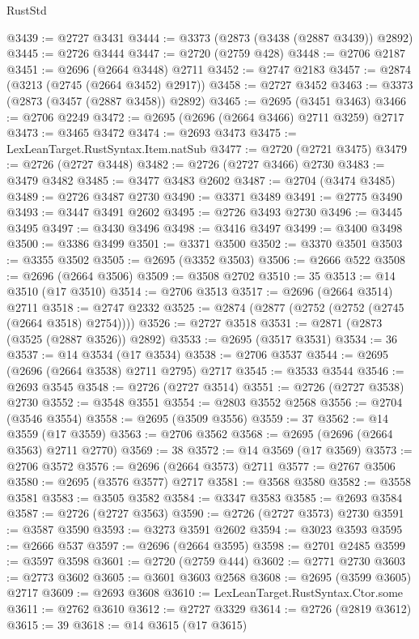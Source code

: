 \begin{lexlean}{RustStd}
\begin{coremodule}
@3439 := @2727 @3431
@3444 := @3373 (@2873 (@3438 (@2887 @3439)) @2892)
@3445 := @2726 @3444
@3447 := @2720 (@2759 @428)
@3448 := @2706 @2187
@3451 := @2696 (@2664 @3448) @2711
@3452 := @2747 @2183
@3457 := @2874 (@3213 (@2745 (@2664 @3452) @2917))
@3458 := @2727 @3452
@3463 := @3373 (@2873 (@3457 (@2887 @3458)) @2892)
@3465 := @2695 (@3451 @3463)
@3466 := @2706 @2249
@3472 := @2695 (@2696 (@2664 @3466) @2711 @3259) @2717
@3473 := @3465 @3472
@3474 := @2693 @3473
@3475 := LexLeanTarget.RustSyntax.Item.natSub
@3477 := @2720 (@2721 @3475)
@3479 := @2726 (@2727 @3448)
@3482 := @2726 (@2727 @3466) @2730
@3483 := @3479 @3482
@3485 := @3477 @3483 @2602
@3487 := @2704 (@3474 @3485)
@3489 := @2726 @3487 @2730
@3490 := @3371 @3489
@3491 := @2775 @3490
@3493 := @3447 @3491 @2602
@3495 := @2726 @3493 @2730
@3496 := @3445 @3495
@3497 := @3430 @3496
@3498 := @3416 @3497
@3499 := @3400 @3498
@3500 := @3386 @3499
@3501 := @3371 @3500
@3502 := @3370 @3501
@3503 := @3355 @3502
@3505 := @2695 (@3352 @3503)
@3506 := @2666 @522
@3508 := @2696 (@2664 @3506)
@3509 := @3508 @2702
@3510 := 35
@3513 := @14 @3510 (@17 @3510)
@3514 := @2706 @3513
@3517 := @2696 (@2664 @3514) @2711
@3518 := @2747 @2332
@3525 := @2874 (@2877 (@2752 (@2752 (@2745 (@2664 @3518) @2754))))
@3526 := @2727 @3518
@3531 := @2871 (@2873 (@3525 (@2887 @3526)) @2892)
@3533 := @2695 (@3517 @3531)
@3534 := 36
@3537 := @14 @3534 (@17 @3534)
@3538 := @2706 @3537
@3544 := @2695 (@2696 (@2664 @3538) @2711 @2795) @2717
@3545 := @3533 @3544
@3546 := @2693 @3545
@3548 := @2726 (@2727 @3514)
@3551 := @2726 (@2727 @3538) @2730
@3552 := @3548 @3551
@3554 := @2803 @3552 @2568
@3556 := @2704 (@3546 @3554)
@3558 := @2695 (@3509 @3556)
@3559 := 37
@3562 := @14 @3559 (@17 @3559)
@3563 := @2706 @3562
@3568 := @2695 (@2696 (@2664 @3563) @2711 @2770)
@3569 := 38
@3572 := @14 @3569 (@17 @3569)
@3573 := @2706 @3572
@3576 := @2696 (@2664 @3573) @2711
@3577 := @2767 @3506
@3580 := @2695 (@3576 @3577) @2717
@3581 := @3568 @3580
@3582 := @3558 @3581
@3583 := @3505 @3582
@3584 := @3347 @3583
@3585 := @2693 @3584
@3587 := @2726 (@2727 @3563)
@3590 := @2726 (@2727 @3573) @2730
@3591 := @3587 @3590
@3593 := @3273 @3591 @2602
@3594 := @3023 @3593
@3595 := @2666 @537
@3597 := @2696 (@2664 @3595)
@3598 := @2701 @2485
@3599 := @3597 @3598
@3601 := @2720 (@2759 @444)
@3602 := @2771 @2730
@3603 := @2773 @3602
@3605 := @3601 @3603 @2568
@3608 := @2695 (@3599 @3605) @2717
@3609 := @2693 @3608
@3610 := LexLeanTarget.RustSyntax.Ctor.some
@3611 := @2762 @3610
@3612 := @2727 @3329
@3614 := @2726 (@2819 @3612)
@3615 := 39
@3618 := @14 @3615 (@17 @3615)

\end{coremodule}
\end{lexlean}
